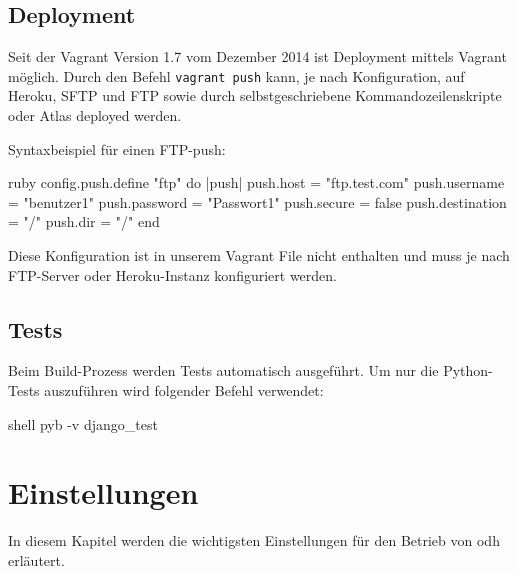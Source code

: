 \subsection{Deployment}
Seit der Vagrant Version 1.7 vom Dezember 2014 ist Deployment mittels Vagrant möglich. Durch den Befehl \texttt{vagrant push} kann, je nach Konfiguration, auf Heroku, SFTP und FTP sowie durch selbstgeschriebene Kommandozeilenskripte oder Atlas deployed werden.

Syntaxbeispiel für einen FTP-push: \cite{vagrant-deployment}
\begin{src}{ruby}
config.push.define "ftp" do |push|
  push.host = "ftp.test.com"
  push.username = "benutzer1"
  push.password = "Passwort1"
  push.secure = false
  push.destination = "/"
  push.dir = "/"
end
\end{src}
Diese Konfiguration ist in unserem Vagrant File nicht enthalten und muss je nach FTP-Server oder Heroku-Instanz konfiguriert werden.

\subsection{Tests}
Beim Build-Prozess werden Tests automatisch ausgeführt. Um nur die Python-Tests auszuführen wird folgender Befehl verwendet:
\begin{src}{shell}
pyb -v django_test
\end{src}

\section{Einstellungen}
In diesem Kapitel werden die wichtigsten Einstellungen für den Betrieb von \acl{odh} erläutert.
